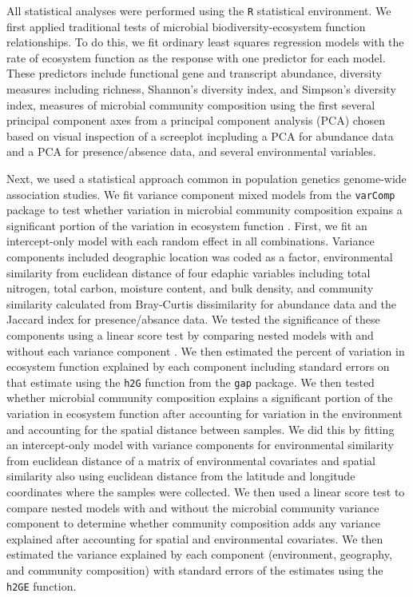 \documentclass{article}
\begin{document}
All statistical analyses were performed using the \texttt{R} statistical
environment. 
We first applied traditional tests of microbial biodiversity-ecosystem function
relationships. To do this, we fit ordinary least squares regression models with
the rate of ecosystem function as the response with one predictor for each
model. These predictors include functional gene and transcript abundance,
diversity measures including richness, Shannon's diversity index, and Simpson's
diversity index, measures of microbial community composition using the first
several principal component axes from a principal component
analysis (PCA) chosen based on visual inspection of a screeplot incpluding a PCA for
abundance data and a PCA for presence/absence data, and several 
environmental variables. 

Next, we used a statistical approach common in population genetics genome-wide
association studies. We fit variance component mixed models from the
\texttt{varComp} package to test whether variation in microbial
community composition expains a significant portion of the variation in
ecosystem function \citep{qu2013}. First, we fit an intercept-only model with
each random effect in all combinations. Variance components included deographic location was coded as a factor, environmental
similarity from euclidean distance of four edaphic variables including total
nitrogen, total carbon, moisture content, and bulk density, and
community similarity calculated from Bray-Curtis dissimilarity for abundance
data and the Jaccard index for presence/absance data. We tested the significance
of these components using a linear score test by comparing nested models with and
without each variance component \citep{qu2013}. We then estimated
the percent of variation in ecosystem function explained by each component 
including standard errors on that estimate 
using the \texttt{h2G} function from the
\texttt{gap} package. We then tested whether microbial community composition explains a
significant portion of the variation in ecosystem function after accounting for
variation in the environment and accounting for the spatial distance between
samples. We did this by fitting an intercept-only model with variance components
for environmental similarity from euclidean distance of a matrix of
environmental covariates and spatial similarity
also using euclidean distance from the latitude and longitude coordinates where
the samples were collected. We then used a linear score test to compare
nested models with and without the microbial community variance component to
determine whether community composition adds any variance explained after
accounting for spatial and environmental covariates. We then estimated the
variance explained by each component (environment, geography, and community
composition) with standard errors of the estimates using the \texttt{h2GE}
function. 
\end{document}
